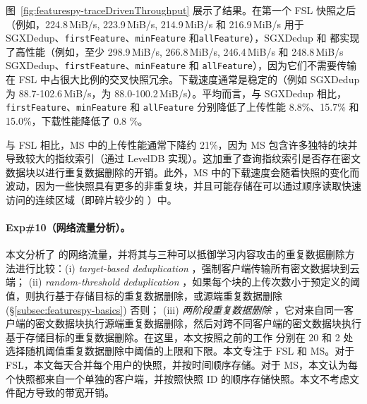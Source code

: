 图~\ref{fig:featurespy-traceDrivenThroughput} 展示了结果。在第一个 FSL 快照之后（例如，224.8\,MiB/s, 223.9\,MiB/s, 214.9\,MiB/s 和 216.9\,MiB/s 用于 SGXDedup、{\tt firstFeature}、{\tt minFeature} 和{\tt allFeature}），SGXDedup 和 \prototype 都实现了高性能（例如，至少 298.9\,MiB/s, 266.8\,MiB/s, 246.4\,MiB/s 和 248.8\,MiB/s SGXDedup、{\tt firstFeature}、{\tt minFeature} 和 {\tt allFeature}），因为它们不需要传输在 FSL 中占很大比例的交叉快照冗余。下载速度通常是稳定的（例如 SGXDedup 为 88.7-102.6\,MiB/s，\prototype 为 88.0-100.2\,MiB/s）。平均而言，与 SGXDedup 相比，{\tt firstFeature}、{\tt minFeature} 和 {\tt allFeature} 分别降低了上传性能 8.8\%、15.7\% 和 15.0\%，下载性能降低了 0.8 \%。

与 FSL 相比，MS 中的上传性能通常下降约 21\%，因为 MS 包含许多独特的块并导致较大的指纹索引（通过 LevelDB \cite{leveldb} 实现）。这加重了查询指纹索引是否存在密文数据块以进行重复数据删除的开销。此外，MS 中的下载速度会随着快照的变化而波动，因为一些快照具有更多的非重复块，并且可能存储在可以通过顺序读取快速访问的连续区域（即碎片较少的 \cite{lillibridge13}）中。


\paragraph*{Exp\#10（网络流量分析）。}
本文分析了 \prototype 的网络流量，并将其与三种可以抵御学习内容攻击的重复数据删除方法进行比较：(i) {\em target-based deduplication} \cite{harnik10}，强制客户端传输所有密文数据块到云端； (ii) {\em random-threshold deduplication} \cite{harnik10}，如果每个块的上传次数小于预定义的阈值，则执行基于存储目标的重复数据删除，或源端重复数据删除 (\S\ref{subsec:featurespy-basics}) 否则； (iii) {\em 两阶段重复数据删除} \cite{li15}，它对来自同一客户端的密文数据块执行源端重复数据删除，然后对跨不同客户端的密文数据块执行基于存储目标的重复数据删除。在这里，本文按照之前的工作 \cite{harnik10} 分别在 20 和 2 处选择随机阈值重复数据删除中阈值的上限和下限。本文专注于 FSL 和 MS。对于 FSL，本文每天合并每个用户的快照，并按时间顺序存储。对于 MS，本文认为每个快照都来自一个单独的客户端，并按照快照 ID 的顺序存储快照。本文不考虑文件配方导致的带宽开销。


